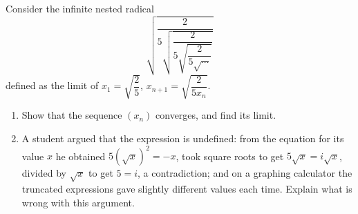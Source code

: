 Consider the infinite nested radical
\[\sqrt{\dfrac{2}{5\sqrt{\dfrac{2}{5\sqrt{\dfrac{2}{5\sqrt{\cdots}}}}}}}\]
defined as the limit of $x_1=\sqrt{\dfrac25}$, $x_{n+1}=\sqrt{\dfrac{2}{5x_n}}$.
\begin{enumerate}
\item[(a)] Show that the sequence $(x_n)$ converges, and find its limit.
\item[(b)] A student argued that the expression is undefined: from the equation for its value $x$ he obtained $5\left(\sqrt{x}\right)^2=-x$, took square roots to get $5\sqrt{x}=i\sqrt{x}$, divided by $\sqrt{x}$ to get $5=i$, a contradiction; and on a graphing calculator the truncated expressions gave slightly different values each time. Explain what is wrong with this argument.
\end{enumerate}
